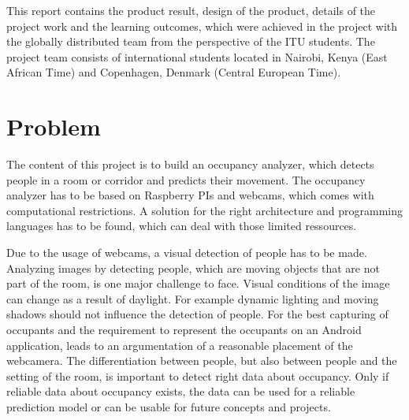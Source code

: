 This report contains the product result, design of the product, details of the project work and the learning outcomes, which were achieved in the project with the globally distributed team from the perspective of the ITU students. The project team consists of international students located in Nairobi, Kenya (East African Time) and Copenhagen, Denmark (Central European Time).


\section{Problem}


The content of this project is to build an occupancy analyzer, which detects people in a room or corridor and predicts their movement. The occupancy analyzer has to be based on Raspberry PIs and webcams, which comes with computational restrictions. A solution for the right architecture and programming languages has to be found, which can deal with those limited ressources.

Due to the usage of webcams, a visual detection of people has to be made. Analyzing images by detecting people, which are moving objects that are not part of the room, is one major challenge to face. Visual conditions of the image can change as a result of daylight. For example dynamic lighting and moving shadows should not influence the detection of people. 
For the best capturing of occupants and the requirement to represent the occupants on an Android application, leads to an argumentation of a reasonable placement of the webcamera. 
The differentiation between people, but also between people and the setting of the room, is important to detect right data about occupancy. Only if reliable data about occupancy exists, the data can be used for a reliable prediction model or can be usable for future concepts and projects.


